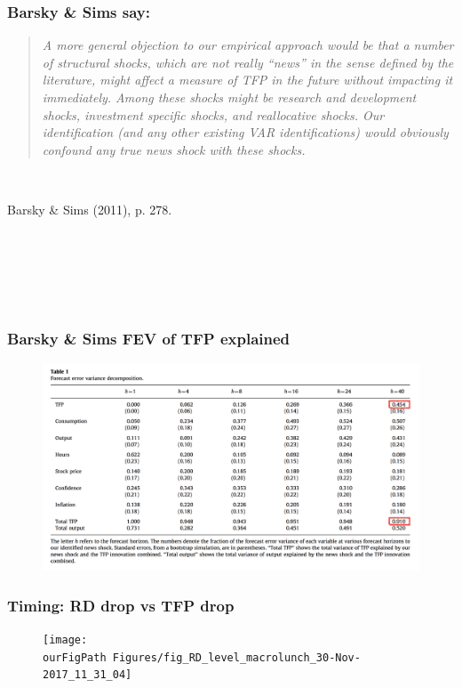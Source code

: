 \documentclass{beamer}
\def \ourFigPath {../../}
\begin{document}
\begin{frame}
	\frametitle{Barsky \& Sims say:}
	\label{BS_quote}
	
\blockquote{\emph{A more general objection to our empirical approach would be that a number of structural shocks, which are not really ``news'' in the sense defined by the literature, might affect a measure of TFP in the future without impacting it immediately. Among these shocks might be research and development shocks, investment specific shocks, and reallocative shocks. Our identification (and any other existing VAR identifications) would obviously confound any true news shock with these shocks.}}

\

\hspace{5cm} Barsky \& Sims (2011), p. 278.

\

\

\
	
\hyperlink{related_lit}{}	
\hyperlink{BS_FEV}{}	
\end{frame}

\begin{frame}
	\frametitle{Barsky \& Sims FEV of TFP explained}
	\label{BS_FEV}
	

\vspace{-1cm}
\noindent
\begin{figure}
\centering
\includegraphics[scale=0.3]{fig_BS_fevtable}
\end{figure}
	
\hyperlink{related_lit}{}	
\end{frame}


\begin{frame}
	\frametitle{Timing: RD drop vs TFP drop}
	\label{timing}
	
	\vspace{-1cm}
	\noindent
	\begin{figure}
		\centering
		\texttt{[image: \\ourFigPath Figures/fig\_RD\_level\_macrolunch\_30-Nov-2017\_11\_31\_04]}
	\end{figure}

	
\hyperlink{convincing}{}	
\end{frame}
\end{document}
